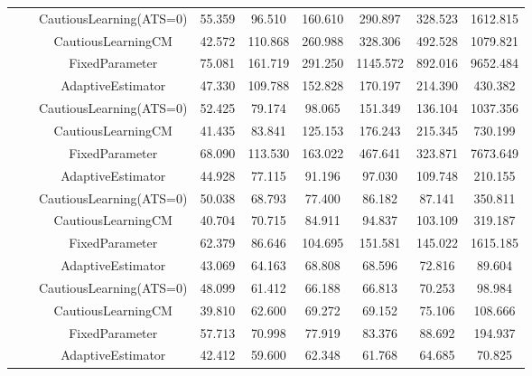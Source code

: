 \begin{table}[!h]
\begin{tabular}[t]{ccccccccc}
 &  & CautiousLearning(ATS=0) & 55.359 & 96.510 & 160.610 & 290.897 & 328.523 & 1612.815\\

 &  & CautiousLearningCM & 42.572 & 110.868 & 260.988 & 328.306 & 492.528 & 1079.821\\

 & \multirow[t]{-4}{*}{\centering\arraybackslash 0.25} & FixedParameter & 75.081 & 161.719 & 291.250 & 1145.572 & 892.016 & 9652.484\\
\cmidrule{2-9}
 &  & AdaptiveEstimator & 47.330 & 109.788 & 152.828 & 170.197 & 214.390 & 430.382\\

 &  & CautiousLearning(ATS=0) & 52.425 & 79.174 & 98.065 & 151.349 & 136.104 & 1037.356\\

 &  & CautiousLearningCM & 41.435 & 83.841 & 125.153 & 176.243 & 215.345 & 730.199\\

 & \multirow[t]{-4}{*}{\centering\arraybackslash 0.35} & FixedParameter & 68.090 & 113.530 & 163.022 & 467.641 & 323.871 & 7673.649\\
\cmidrule{2-9}
 &  & AdaptiveEstimator & 44.928 & 77.115 & 91.196 & 97.030 & 109.748 & 210.155\\

 &  & CautiousLearning(ATS=0) & 50.038 & 68.793 & 77.400 & 86.182 & 87.141 & 350.811\\

 &  & CautiousLearningCM & 40.704 & 70.715 & 84.911 & 94.837 & 103.109 & 319.187\\

 & \multirow[t]{-4}{*}{\centering\arraybackslash 0.50} & FixedParameter & 62.379 & 86.646 & 104.695 & 151.581 & 145.022 & 1615.185\\
\cmidrule{2-9}
 &  & AdaptiveEstimator & 43.069 & 64.163 & 68.808 & 68.596 & 72.816 & 89.604\\

 &  & CautiousLearning(ATS=0) & 48.099 & 61.412 & 66.188 & 66.813 & 70.253 & 98.984\\

 &  & CautiousLearningCM & 39.810 & 62.600 & 69.272 & 69.152 & 75.106 & 108.666\\

 & \multirow[t]{-4}{*}{\centering\arraybackslash 0.75} & FixedParameter & 57.713 & 70.998 & 77.919 & 83.376 & 88.692 & 194.937\\
\cmidrule{2-9}
 &  & AdaptiveEstimator & 42.412 & 59.600 & 62.348 & 61.768 & 64.685 & 70.825\\


\end{tabular}
\end{table}
